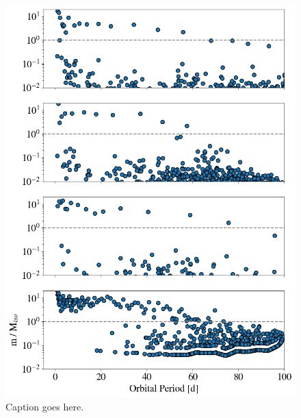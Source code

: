 \documentclass[twocolumn]{aastex63}
\begin{document}
\begin{figure}
\begin{center}
    \includegraphics[width=\textwidth]{figures/surfden_iso.png}
    \caption{Caption goes here.\label{fig:surfden_iso}}
\end{center}
\end{figure}


\end{document}

